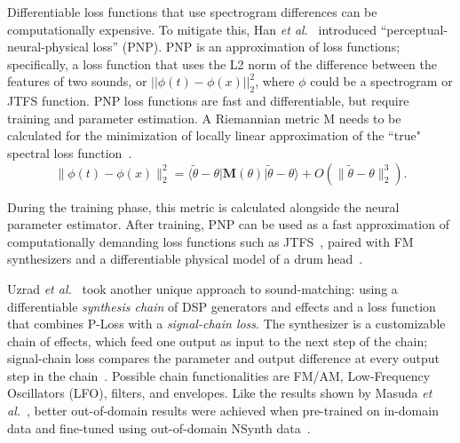 \documentclass[lettersize,journal]{IEEEtran}
\providecommand{\gls}[1]{#1}
\begin{document}
Differentiable loss functions that use spectrogram differences can be computationally expensive. To mitigate this, Han \textit{et al.}~\cite{han2023perceptual} introduced ``perceptual-neural-physical loss'' (PNP). PNP is an approximation of loss functions; specifically, a loss function that uses the L2 norm of the difference between the features of two sounds, or $||\phi(t) - \phi(x)||^2_2$, where $\phi$ could be a spectrogram or JTFS function. PNP loss functions are fast and differentiable, but require training and parameter estimation. A Riemannian metric M needs to be calculated for the minimization of locally linear approximation of the ``true" spectral loss function~\cite{han2023perceptual}. 
\[
\|\phi(t) - \phi(x)\|_2^2 = \langle \tilde{\theta} - \theta | \mathbf{M}(\theta) | \tilde{\theta} - \theta \rangle + O(\|\tilde{\theta} - \theta\|_2^3). \tag{4}
\]

During the training phase, this metric is calculated alongside the neural parameter estimator. After training, PNP can be used as a fast approximation of computationally demanding loss functions such as JTFS~\cite{han2023perceptual,han2024learning}, paired with FM synthesizers and a differentiable physical model of a drum head~\cite{smith2010physical}.

Uzrad \textit{et al.}~\cite{uzrad2024diffmoog} took another unique approach to sound-matching: using a differentiable \textit{synthesis chain} of DSP generators and effects and a loss function that combines P-Loss with a \textit{signal-chain loss}. The synthesizer is a customizable chain of effects, which feed one output as input to the next step of the chain; signal-chain loss compares the parameter and output difference at every output step in the chain~\cite{uzrad2024diffmoog}. Possible chain functionalities are FM/AM, Low-Frequency Oscillators (\gls{LFO}), filters, and envelopes. Like the results shown by Masuda \textit{et al.}~\cite{masuda2021soundmatch}, better out-of-domain results were achieved when pre-trained on in-domain data and fine-tuned using out-of-domain NSynth data~\cite{engel2017neural}. 


\end{document}
